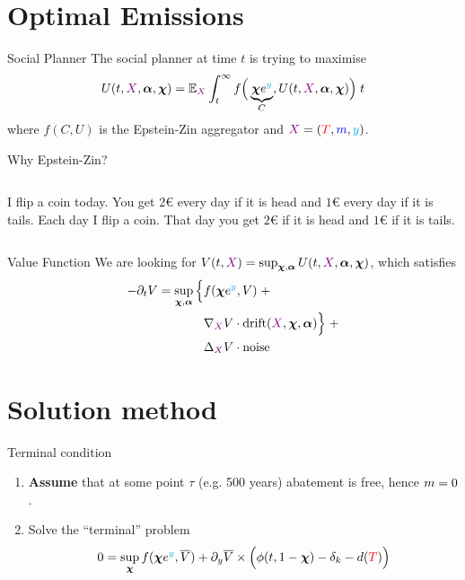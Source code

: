 \documentclass[pdf]{beamer}
\let\d\relax
\newcommand{\d}[1]{\mathrm{d}#1}
\newcommand{\control}[1]{\bm{#1}}
\newcommand{\X}{{\color{violet} X}}
\begin{document}
\section{Optimal Emissions}

\begin{frame}{Social Planner}
    The social planner at time $t$ is trying to maximise \begin{equation*}
        U(t, \X, \control{\alpha}, \control{\chi}) = \mathbb{E}_{\X} \int^\infty_t f\Big(\underbrace{\control{\chi} e^{{\color{cyan} y}}}_{C}, U(t, \X, \control{\alpha}, \control{\chi})\Big) \; \d t
    \end{equation*} where $f(C, U)$ is the Epstein-Zin aggregator and $\X = ({\color{red} T}, {\color{blue} m}, {\color{cyan} y})$.
\end{frame}

\begin{frame}{Why Epstein-Zin?}
    \begin{columns}
        \pause {}
        I flip a coin today. You get $2$€ every day if it is head and $1$€ every day if it is tails.
        \pause {}
        Each day I flip a coin. That day you get $2$€ if it is head and $1$€ if it is tails.
    \end{columns}
\end{frame}

\begin{frame}{Value Function}
    We are looking for $V(t, \X) = \sup_{\control{\chi}, \control{\alpha}} U(t, \X, \control{\alpha}, \control{\chi})$, which satisfies
    \begin{equation*}
        \begin{split}
            -\partial_t V = \sup_{\control{\chi}, \control{\alpha}} \Big\{ &f(\control{\chi} e^{\color{cyan} y}, V) \; +\\
            &\nabla_{\X} V \cdot \text{drift}(\X, \control{\chi}, \control{\alpha}) \Big\} \; + \\
            &\Delta_{\X} V \cdot \text{noise}
        \end{split}
    \end{equation*}
\end{frame}

\section{Solution method}
\begin{frame}{Terminal condition}
    \begin{enumerate}
        \item \textbf{Assume} that at some point $\tau$ (e.g. 500 years) abatement is free, hence $\d m = 0$.
        \pause \item Solve the ``terminal'' problem \begin{equation*}
            0 = \sup_{\control{\chi}} f(\control{\chi} e^{\color{cyan} y}, \overline{V}) + \partial_y \overline{V} \times \Big( \phi(t, 1 - \control{\chi}) - \delta_k - d({\color{red} T}) \Big)
        \end{equation*}
    \end{enumerate}
\end{frame}
\end{document}
